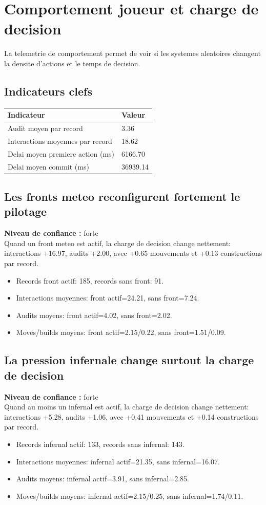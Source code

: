 \documentclass[11pt,a4paper]{article}
\begin{document}
\section{Comportement joueur et charge de decision}
La telemetrie de comportement permet de voir si les systemes aleatoires changent la densite d'actions et le temps de decision.
\subsection*{Indicateurs clefs}
\begin{tabularx}{\linewidth}{lX}
\toprule
Indicateur & Valeur \\
\midrule
Audit moyen par record & 3.36 \\
Interactions moyennes par record & 18.62 \\
Delai moyen premiere action (ms) & 6166.70 \\
Delai moyen commit (ms) & 36939.14 \\
\bottomrule
\end{tabularx}
\subsection*{Les fronts meteo reconfigurent fortement le pilotage}
\textbf{Niveau de confiance :} forte\\
Quand un front meteo est actif, la charge de decision change nettement: interactions +16.97, audits +2.00, avec +0.65 mouvements et +0.13 constructions par record.
\begin{itemize}
\item Records front actif: 185, records sans front: 91.
\item Interactions moyennes: front actif=24.21, sans front=7.24.
\item Audits moyens: front actif=4.02, sans front=2.02.
\item Moves/builds moyens: front actif=2.15/0.22, sans front=1.51/0.09.
\end{itemize}
\subsection*{La pression infernale change surtout la charge de decision}
\textbf{Niveau de confiance :} forte\\
Quand au moins un infernal est actif, la charge de decision change nettement: interactions +5.28, audits +1.06, avec +0.41 mouvements et +0.14 constructions par record.
\begin{itemize}
\item Records infernal actif: 133, records sans infernal: 143.
\item Interactions moyennes: infernal actif=21.35, sans infernal=16.07.
\item Audits moyens: infernal actif=3.91, sans infernal=2.85.
\item Moves/builds moyens: infernal actif=2.15/0.25, sans infernal=1.74/0.11.
\end{itemize}
\end{document}
